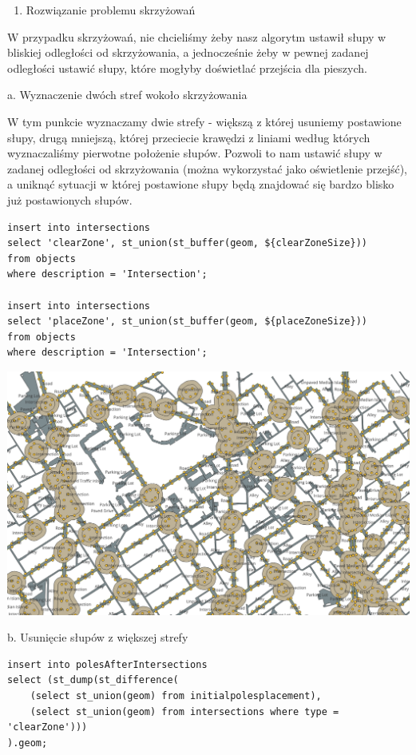 \documentclass[11pt]{article}
\begin{document}
\begin{enumerate}
\item Rozwiązanie problemu skrzyżowań
\end{enumerate}

W przypadku skrzyżowań, nie chcieliśmy żeby nasz algorytm ustawił słupy w bliskiej odległości od skrzyżowania, a jednocześnie żeby w pewnej zadanej odległości ustawić słupy, które mogłyby doświetlać przejścia dla pieszych. 

a. Wyznaczenie dwóch stref wokoło skrzyżowania 

W tym punkcie wyznaczamy dwie strefy - większą z której usuniemy postawione słupy, drugą mniejszą, której przeciecie krawędzi z liniami według których wyznaczaliśmy pierwotne położenie słupów. Pozwoli to nam ustawić słupy w zadanej odległości od skrzyżowania (można wykorzystać jako oświetlenie przejść), a uniknąć sytuacji w której postawione słupy będą znajdować się bardzo blisko już postawionych słupów.

\begin{verbatim}
insert into intersections 
select 'clearZone', st_union(st_buffer(geom, ${clearZoneSize})) 
from objects 
where description = 'Intersection';

insert into intersections 
select 'placeZone', st_union(st_buffer(geom, ${placeZoneSize})) 
from objects 
where description = 'Intersection';
\end{verbatim}

\begin{center}
\includegraphics[width=.9\linewidth]{./img/4.png}
\end{center}

b. Usunięcie słupów z większej strefy

\begin{verbatim}
insert into polesAfterIntersections 
select (st_dump(st_difference(
    (select st_union(geom) from initialpolesplacement), 
    (select st_union(geom) from intersections where type = 'clearZone')))
).geom;
\end{verbatim}
\end{document}
